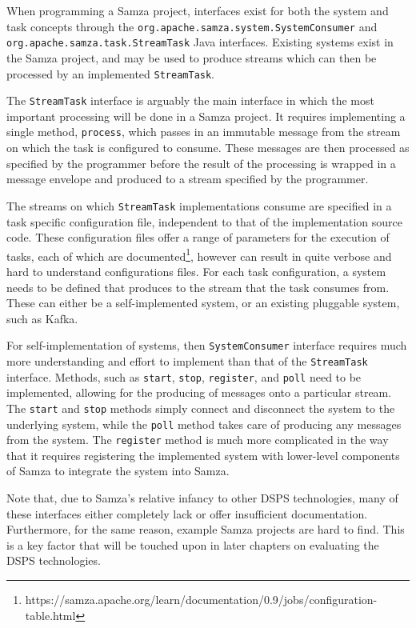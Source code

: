 When programming a Samza project, interfaces exist for both the system and task concepts through the \texttt{org.apache.samza.system.SystemConsumer}
and \texttt{org.apache.samza.task.StreamTask} Java interfaces. Existing systems exist in the Samza project, and may be
used to produce streams which can then be processed by an implemented \texttt{StreamTask}.

The \texttt{StreamTask} interface is arguably the main interface in which the most important processing will be done in
a Samza project. It requires implementing a single method, \texttt{process}, which passes in an immutable message from the stream
on which the task is configured to consume. These messages are then processed as specified by the programmer before the
result of the processing is wrapped in a message envelope and produced to a stream specified by the programmer.

The streams on which \texttt{StreamTask} implementations consume are specified in a task specific configuration file,
independent to that of the implementation source code. These configuration files offer a range of parameters for the
execution of tasks, each of which are documented\footnote{https://samza.apache.org/learn/documentation/0.9/jobs/configuration-table.html},
however can result in quite verbose and hard to understand configurations files. For each task configuration, a system
needs to be defined that produces to the stream that the task consumes from. These can either be a self-implemented
system, or an existing pluggable system, such as Kafka.

For self-implementation of systems, then \texttt{SystemConsumer} interface requires much more understanding and effort to
implement than that of the \texttt{StreamTask} interface. Methods, such as \texttt{start}, \texttt{stop}, \texttt{register},
and \texttt{poll} need to be implemented, allowing for the producing of messages onto a particular stream. The \texttt{start}
and \texttt{stop} methods simply connect and disconnect the system to the underlying system, while the \texttt{poll}
method takes care of producing any messages from the system. The \texttt{register} method is much more complicated in the
way that it requires registering the implemented system with lower-level components of Samza to integrate the system into
Samza.

Note that, due to Samza's relative infancy to other DSPS technologies, many of these interfaces either completely lack
or offer insufficient documentation. Furthermore, for the same reason, example Samza projects are hard to find. This is
a key factor that will be touched upon in later chapters on evaluating the DSPS technologies.

